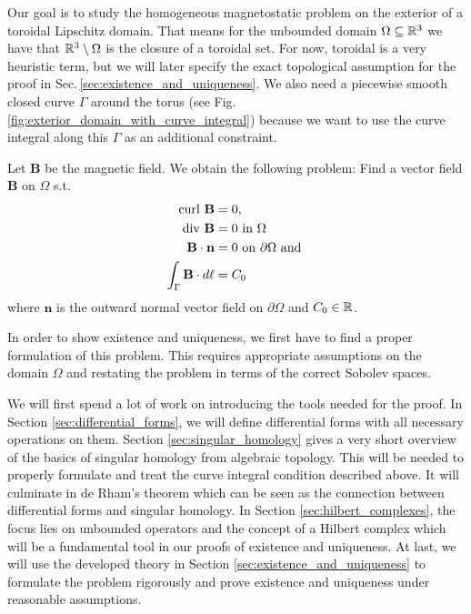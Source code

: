 \documentclass[../master_thesis.tex]{subfiles}
\begin{document}
Our goal is to study the homogeneous magnetostatic problem on the exterior 
of a toroidal Lipschitz domain. That means 
for the unbounded domain $\Omega \subseteq \mathbb{R}^3$ we have that
$\mathbb{R}^3 \setminus \Omega$ is the closure of a toroidal set. 
For now, toroidal is a very heuristic term, but we will later specify 
the exact topological assumption for the proof in Sec.\,\ref{sec:existence_and_uniqueness}.
We also need a 
piecewise smooth closed curve $\Gamma$ around the torus (see Fig.\,\ref{fig:exterior_domain_with_curve_integral})
because we want to use the curve integral along this $\Gamma$ as an additional 
constraint.

Let $\mathbf{B}$ be the magnetic field. We obtain the following problem:
Find a vector field $\mathbf{B}$ on $\Omega$ s.t.
\begin{align}
    \operatorname{curl} \, \mathbf{B} &= 0, \\ 
    \operatorname{div} \, \mathbf{B}  &= 0 \text{ in } \Omega \\
    \mathbf{B} \cdot \mathbf{n} &= 0 \text{ on } \partial \Omega \text{ and }\label{eq:pointwise_normal_trace}\\ 
    \int_\Gamma \mathbf{B} \cdot d\ell &= C_0 \label{eq:first_curve_integral_condition}
\end{align}
where $\mathbf{n}$ is the outward normal vector field on $\partial \Omega$ and 
$C_0 \in \mathbb{R}$. 


In order to show existence and uniqueness, we first have to find
a proper formulation of this problem. This requires 
appropriate assumptions on the domain $\Omega$ and restating the problem
in terms of the correct Sobolev spaces.

We will first spend a lot of work on introducing the tools needed for the proof.
In Section \ref{sec:differential_forms}, we will define differential forms with 
all necessary operations on them. Section \ref{sec:singular_homology} gives a very short
overview of the basics of  
singular homology from algebraic topology. This will be needed to properly formulate and treat the
curve integral condition described above. It will culminate in de Rham's theorem 
which can be seen as the connection between differential forms and singular homology.
In Section \ref{sec:hilbert_complexes}, the focus lies on 
unbounded operators and the concept of a Hilbert complex which will be a
fundamental tool in our proofs of existence and uniqueness. At last, we will 
use the developed theory in Section \ref{sec:existence_and_uniqueness} 
to formulate the problem rigorously and prove existence and uniqueness under 
reasonable assumptions. 
\end{document}
